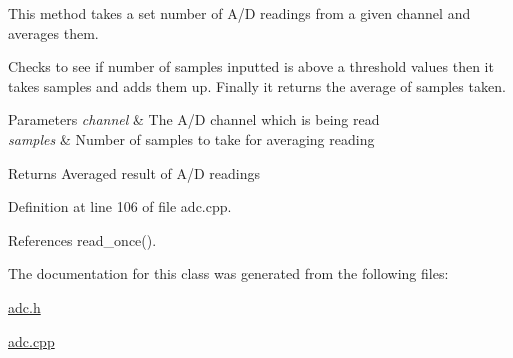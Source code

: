 This method takes a set number of A/\-D readings from a given channel and averages them. 

Checks to see if number of samples inputted is above a threshold values then it takes samples and adds them up. Finally it returns the average of samples taken. 
\begin{DoxyParams}{Parameters}
{\em channel} & The A/\-D channel which is being read \\
\hline
{\em samples} & Number of samples to take for averaging reading \\
\hline
\end{DoxyParams}
\begin{DoxyReturn}{Returns}
Averaged result of A/\-D readings 
\end{DoxyReturn}


Definition at line 106 of file adc.\-cpp.



References read\-\_\-once().



The documentation for this class was generated from the following files\-:\begin{DoxyCompactItemize}
\item 
\hyperlink{adc_8h}{adc.\-h}\item 
\hyperlink{adc_8cpp}{adc.\-cpp}\end{DoxyCompactItemize}
